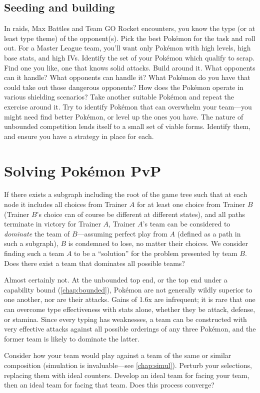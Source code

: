 \subsection{Seeding and building\label{subsec:seeding}}
In raids, Max Battles and Team GO Rocket encounters, you know the type (or at least type theme)
 of the opponent(s).
Pick the best Pokémon for the task and roll out.
For a Master League team, you'll want only Pokémon with high levels, high base stats, and high IVs.
Identify the set of your Pokémon which qualify to scrap.
Find one you like, one that knows solid attacks.
Build around it.
What opponents can it handle?
What opponents can handle it?
What Pokémon do you have that could take out those dangerous opponents?
How does the Pokémon operate in various shielding scenarios?
Take another suitable Pokémon and repeat the exercise around it.
Try to identify Pokémon that can overwhelm your team---you might need find better
 Pokémon, or level up the ones you have.
The nature of unbounded competition lends itself to a small set of viable forms.
Identify them, and ensure you have a strategy in place for each.

\section{Solving Pokémon PvP}
If there exists a subgraph including the root of the game tree such that at each
  node it includes all choices from Trainer $A$ for at least one choice from Trainer $B$
  (Trainer $B$'s choice can of course be different at different states), and all
  paths terminate in victory for Trainer $A$, Trainer $A$'s team can be considered
  to \textit{dominate} the team of $B$---assuming perfect play from $A$ (defined
  as a path in such a subgraph), $B$ is condemned to lose, no matter their choices.
We consider finding such a team $A$ to be a ``solution'' for the problem presented
  by team $B$.
Does there exist a team that dominates all possible teams?

Almost certainly not.
At the unbounded top end, or the top end under a capability bound (\autoref{chap:bounded}), Pokémon are not generally
  wildly superior to one another, nor are their attacks.
Gains of 1.6x are infrequent; it is rare that one can overcome type
  effectiveness with stats alone, whether they be attack, defense, or stamina.
Since every typing has weaknesses, a team can be constructed with
  very effective attacks against all possible orderings of any three Pokémon,
  and the former team is likely to dominate the latter.

Consider how your team would play against a team of the same or similar composition (simulation
  is invaluable---see \autoref{chap:simul}).
Perturb your selections, replacing them with ideal counters.
Develop an ideal team for facing your team, then an ideal team for facing that team.
Does this process converge?

